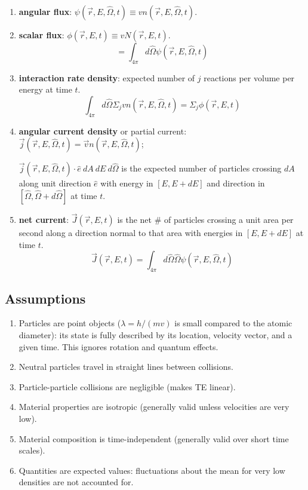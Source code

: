 \documentclass[12pt]{article}
\newcommand{\vOmega}{\ensuremath{\hat{\Omega}}}
\begin{document}
\begin{enumerate}
\item \textbf{angular flux}: $\psi(\vec{r}, E, \vOmega, t) \equiv v n(\vec{r}, E, \vOmega, t)$.

\item \textbf{scalar flux}: $\phi(\vec{r},E,t) \equiv v N(\vec{r},E,t)$.
%
\[= \int_{4\pi} d\vOmega \psi(\vec{r}, E, \vOmega, t) \]

\item \textbf{interaction rate density}: expected number of $j$ reactions per volume per energy at time $t$.
%
\[\int_{4\pi} d\vOmega \Sigma_j v n(\vec{r}, E, \vOmega, t) = \Sigma_j \phi(\vec{r},E,t)\]

\item \textbf{angular current density} or partial current: $\vec{j}(\vec{r}, E, \vOmega, t) = \vec{v} n(\vec{r}, E, \vOmega, t)$; 

$\vec{j}(\vec{r}, E, \vOmega, t) \cdot \hat{e}\: dA\: dE\: d\vOmega$ is the expected number of particles crossing $dA$ along unit direction $\hat{e}$ with energy in $[E, E + dE]$ and direction in $[\vOmega, \vOmega + d\vOmega]$ at time $t$.

\item \textbf{net current}: $\vec{J}(\vec{r}, E, t) $ is the net \# of particles crossing a unit area per second along a direction normal to that area with energies in $[E, E + dE]$ at time $t$.
\[\vec{J}(\vec{r}, E, t) = \int_{4\pi} d\vOmega \vOmega \psi(\vec{r}, E, \vOmega, t)\]

\end{enumerate}

\subsection*{Assumptions}
\begin{enumerate}
\item Particles are point objects ($\lambda = h/(mv)$ is small compared to the atomic diameter): its state is fully described by its location, velocity vector, and a given time. This ignores rotation and quantum effects.

\item Neutral particles travel in straight lines between collisions.

\item Particle-particle collisions are negligible (makes TE linear).

\item Material properties are isotropic (generally valid unless velocities are very low).

\item Material composition is time-independent (generally valid over short time scales).

\item Quantities are expected values: fluctuations about the mean for very low densities are not accounted for.
\end{enumerate}
\end{document}
